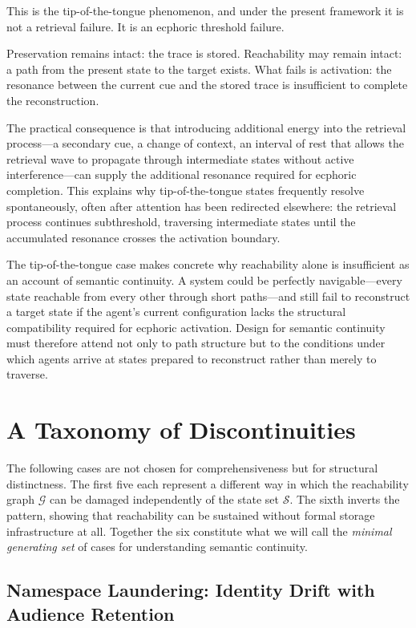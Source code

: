 \documentclass[12pt]{article}
\newcommand{\sS}{\mathcal{S}}
\newcommand{\sG}{\mathcal{G}}
\begin{document}
This is the tip-of-the-tongue phenomenon, and under the present framework
it is not a retrieval failure.
It is an ecphoric threshold failure.

Preservation remains intact: the trace is stored.
Reachability may remain intact: a path from the present state to the
target exists.
What fails is activation: the resonance between the current cue and the
stored trace is insufficient to complete the reconstruction.

The practical consequence is that introducing additional energy into
the retrieval process---a secondary cue, a change of context, an
interval of rest that allows the retrieval wave to propagate through
intermediate states without active interference---can supply the
additional resonance required for ecphoric completion.
This explains why tip-of-the-tongue states frequently resolve
spontaneously, often after attention has been redirected elsewhere:
the retrieval process continues subthreshold, traversing intermediate
states until the accumulated resonance crosses the activation boundary.

The tip-of-the-tongue case makes concrete why reachability alone is
insufficient as an account of semantic continuity.
A system could be perfectly navigable---every state reachable from
every other through short paths---and still fail to reconstruct a
target state if the agent's current configuration lacks the structural
compatibility required for ecphoric activation.
Design for semantic continuity must therefore attend not only to path
structure but to the conditions under which agents arrive at states
prepared to reconstruct rather than merely to traverse.

\section{A Taxonomy of Discontinuities}

The following cases are not chosen for comprehensiveness but for
structural distinctness.
The first five each represent a different way in which the reachability graph
$\sG$ can be damaged independently of the state set $\sS$.
The sixth inverts the pattern, showing that reachability can be sustained
without formal storage infrastructure at all.
Together the six constitute what we will call the \emph{minimal generating set}
of cases for understanding semantic continuity.

\subsection{Namespace Laundering: Identity Drift with Audience Retention}
\end{document}
